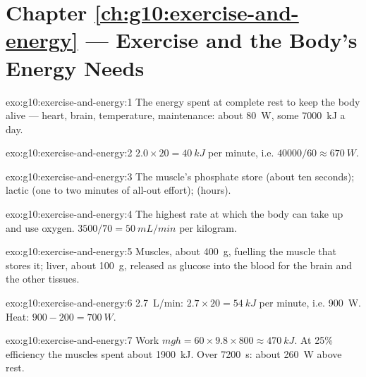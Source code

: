 \section*{Chapter \ref{ch:g10:exercise-and-energy} --- Exercise and the Body's Energy Needs}

\begin{solution}{exo:g10:exercise-and-energy:1}
The energy spent at complete rest to keep the body alive --- heart,
brain, temperature,  maintenance: about \qty{80}{W}, some
\qty{7000}{kJ} a day.
\end{solution}

\begin{solution}{exo:g10:exercise-and-energy:2}
$2.0 \times 20 = \qty{40}{kJ}$ per minute, i.e. $40000/60 \approx
\qty{670}{W}$.
\end{solution}

\begin{solution}{exo:g10:exercise-and-energy:3}
The muscle's phosphate store (about ten seconds); lactic 
(one to two minutes of all-out effort);  (hours).
\end{solution}

\begin{solution}{exo:g10:exercise-and-energy:4}
The highest rate at which the body can take up and use oxygen.
$3500/70 = \qty{50}{mL/min}$ per kilogram.
\end{solution}

\begin{solution}{exo:g10:exercise-and-energy:5}
Muscles, about \qty{400}{g}, fuelling the muscle that stores it;
liver, about \qty{100}{g}, released as glucose into the blood for the
brain and the other tissues.
\end{solution}

\begin{solution}{exo:g10:exercise-and-energy:6}
\qty{2.7}{L/min}: $2.7 \times 20 = \qty{54}{kJ}$ per minute, i.e.
\qty{900}{W}. Heat: $900 - 200 = \qty{700}{W}$.
\end{solution}

\begin{solution}{exo:g10:exercise-and-energy:7}
Work $mgh = 60 \times 9.8 \times 800 \approx \qty{470}{kJ}$. At 25\%
efficiency the muscles spent about \qty{1900}{kJ}. Over \qty{7200}{s}:
about \qty{260}{W} above rest.
\end{solution}

